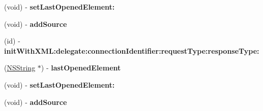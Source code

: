 \begin{DoxyCompactItemize}
\item 
\hypertarget{interface_m_g_twitter_x_m_l_parser_aa2e7eb457f995c9462f125c33dbbd29b}{
(void) -\/ {\bfseries set\-Last\-Opened\-Element\-:}}
\label{interface_m_g_twitter_x_m_l_parser_aa2e7eb457f995c9462f125c33dbbd29b}

\item 
\hypertarget{interface_m_g_twitter_x_m_l_parser_a984290a5b4b08733da8e0892e9ea7d06}{
(void) -\/ {\bfseries add\-Source}}
\label{interface_m_g_twitter_x_m_l_parser_a984290a5b4b08733da8e0892e9ea7d06}

\item 
\hypertarget{interface_m_g_twitter_x_m_l_parser_a0ac17bed31a74f0234704fbf8a514f16}{
(id) -\/ {\bfseries init\-With\-X\-M\-L\-:delegate\-:connection\-Identifier\-:request\-Type\-:response\-Type\-:}}
\label{interface_m_g_twitter_x_m_l_parser_a0ac17bed31a74f0234704fbf8a514f16}

\item 
\hypertarget{interface_m_g_twitter_x_m_l_parser_a3b952453133dc9fbad477ee8c0d3a57f}{
(\hyperlink{class_n_s_string}{\-N\-S\-String} $\ast$) -\/ {\bfseries last\-Opened\-Element}}
\label{interface_m_g_twitter_x_m_l_parser_a3b952453133dc9fbad477ee8c0d3a57f}

\item 
\hypertarget{interface_m_g_twitter_x_m_l_parser_aa2e7eb457f995c9462f125c33dbbd29b}{
(void) -\/ {\bfseries set\-Last\-Opened\-Element\-:}}
\label{interface_m_g_twitter_x_m_l_parser_aa2e7eb457f995c9462f125c33dbbd29b}

\item 
\hypertarget{interface_m_g_twitter_x_m_l_parser_a984290a5b4b08733da8e0892e9ea7d06}{
(void) -\/ {\bfseries add\-Source}}
\label{interface_m_g_twitter_x_m_l_parser_a984290a5b4b08733da8e0892e9ea7d06}

\end{DoxyCompactItemize}
